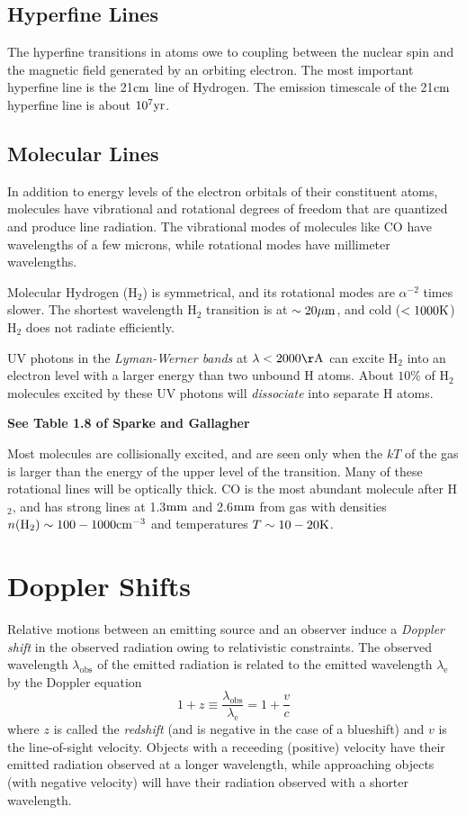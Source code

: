 \documentclass[12pt]{article}
\begin{document}
\subsection{Hyperfine Lines}

The hyperfine transitions in atoms owe to coupling between the nuclear
spin and the magnetic field generated by an orbiting electron. The
most important hyperfine line is the 21$\mathrm{cm}$ line of Hydrogen. The
emission timescale of the 21$\mathrm{cm}$ hyperfine line is about $10^{7}\mathrm{yr}$.

\subsection{Molecular Lines}

In addition to energy levels of the electron orbitals of their
constituent atoms, molecules have vibrational and rotational 
degrees of freedom that are quantized and produce line radiation.
The vibrational modes of molecules like CO have wavelengths of
a few microns, while rotational modes have millimeter wavelengths.

Molecular Hydrogen (H$_2$) is symmetrical, and its rotational
modes are $\alpha^{-2}$ times slower. The shortest wavelength
H$_2$ transition is at $\sim20\mu\mathrm{m}$, and cold ($<1000\mathrm{K}$) H$_2$
does not radiate efficiently.

UV photons in the {\it Lyman-Werner bands} at $\lambda<2000\Ang$ can
excite H$_2$ into an electron level with a larger energy than two
unbound H atoms. About $10\%$ of H$_2$ molecules excited by these UV
photons will {\it dissociate} into separate H atoms.

{\bf See Table 1.8 of Sparke and Gallagher}

Most molecules are collisionally excited, and are seen only
when the $kT$ of the gas is larger than the energy of the upper
level of the transition. Many of these 
rotational lines will be optically thick. CO is the most
abundant molecule after H$_2$, and has strong lines at 1.3$\mathrm{mm}$ and
2.6$\mathrm{mm}$ from gas with densities $n(\mathrm{H}_2)\sim100-1000\mathrm{cm}^{-3}$
and temperatures $T\sim10-20\mathrm{K}$.


\section{Doppler Shifts}

Relative motions between an emitting source and an observer
induce a {\it Doppler shift} in the observed radiation owing
to relativistic constraints. The observed wavelength 
$\lambda_{\mathrm{obs}}$ of the emitted radiation is
related to the emitted wavelength $\lambda_{\mathrm{e}}$
by the Doppler equation
\begin{equation}
1+z \equiv \frac{\lambda_{\mathrm{obs}} }{\lambda_{\mathrm{e}} } = 1+\frac{v}{c}
\end{equation}
\noindent
where $z$ is called the {\it redshift} 
(and is negative in the case of a blueshift) and $v$ is the
line-of-sight velocity.
Objects with a receeding (positive) velocity have their
emitted radiation observed at a longer wavelength, while
approaching objects (with negative velocity) will have their
radiation observed with a shorter wavelength.
\end{document}
